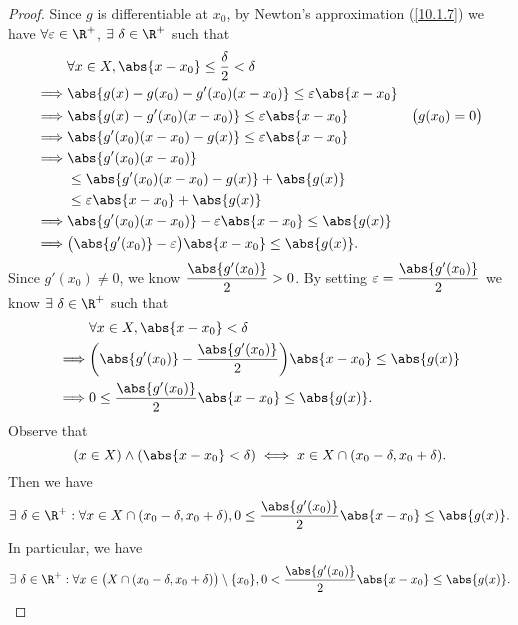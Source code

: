 \begin{proof}
  Since \(g\) is differentiable at \(x_0\), by Newton's approximation (\cref{10.1.7}) we have \(\forall \varepsilon \in \R^+\), \(\exists\ \delta \in \R^+\) such that
  \begin{align*}
             & \forall x \in X, \abs{x - x_0} \leq \dfrac{\delta}{2} < \delta                               \\
    \implies & \abs{g(x) - g(x_0) - g'(x_0)(x - x_0)} \leq \varepsilon \abs{x - x_0}                        \\
    \implies & \abs{g(x) - g'(x_0)(x - x_0)} \leq \varepsilon \abs{x - x_0}          & \big(g(x_0) = 0\big) \\
    \implies & \abs{g'(x_0)(x - x_0) - g(x)} \leq \varepsilon \abs{x - x_0}                                 \\
    \implies & \abs{g'(x_0)(x - x_0)}                                                                       \\
             & \leq \abs{g'(x_0)(x - x_0) - g(x)} + \abs{g(x)}                                              \\
             & \leq \varepsilon \abs{x - x_0} + \abs{g(x)}                                                  \\
    \implies & \abs{g'(x_0)(x - x_0)} - \varepsilon \abs{x - x_0} \leq \abs{g(x)}                           \\
    \implies & \big(\abs{g'(x_0)} - \varepsilon\big)\abs{x - x_0} \leq \abs{g(x)}.
  \end{align*}
  Since \(g'(x_0) \neq 0\), we know \(\dfrac{\abs{g'(x_0)}}{2} > 0\).
  By setting \(\varepsilon = \dfrac{\abs{g'(x_0)}}{2}\) we know \(\exists\ \delta \in \R^+\) such that
  \begin{align*}
             & \forall x \in X, \abs{x - x_0} < \delta                                            \\
    \implies & \bigg(\abs{g'(x_0)} - \dfrac{\abs{g'(x_0)}}{2}\bigg) \abs{x - x_0} \leq \abs{g(x)} \\
    \implies & 0 \leq \dfrac{\abs{g'(x_0)}}{2} \abs{x - x_0} \leq \abs{g(x)}.
  \end{align*}
  Observe that
  \[
    (x \in X) \land (\abs{x - x_0} < \delta) \iff x \in X \cap (x_0 - \delta, x_0 + \delta).
  \]
  Then we have
  \[
    \exists\ \delta \in \R^+ : \forall x \in X \cap (x_0 - \delta, x_0 + \delta), 0 \leq \dfrac{\abs{g'(x_0)}}{2} \abs{x - x_0} \leq \abs{g(x)}.
  \]
  In particular, we have
  \[
    \exists\ \delta \in \R^+ : \forall x \in \big(X \cap (x_0 - \delta, x_0 + \delta)\big) \setminus \{x_0\}, 0 < \dfrac{\abs{g'(x_0)}}{2} \abs{x - x_0} \leq \abs{g(x)}.
\]
\end{proof}
